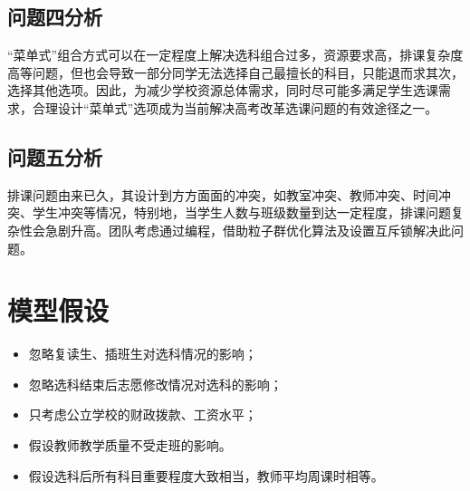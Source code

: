 \documentclass[bwprint]{cumcmthesis}
\begin{document}
\subsection{问题四分析}
“菜单式”组合方式可以在一定程度上解决选科组合过多，资源要求高，排课复杂度高等问题，但也会导致一部分同学无法选择自己最擅长的科目，只能退而求其次，选择其他选项。因此，为减少学校资源总体需求，同时尽可能多满足学生选课需求，合理设计“菜单式”选项成为当前解决高考改革选课问题的有效途径之一。
\subsection{问题五分析}
排课问题由来已久，其设计到方方面面的冲突，如教室冲突、教师冲突、时间冲突、学生冲突等情况，特别地，当学生人数与班级数量到达一定程度，排课问题复杂性会急剧升高。团队考虑通过编程，借助粒子群优化算法及设置互斥锁解决此问题。


\section{模型假设}
\begin{itemize}
\item 忽略复读生、插班生对选科情况的影响；
\item 忽略选科结束后志愿修改情况对选科的影响；
\item 只考虑公立学校的财政拨款、工资水平；
\item 假设教师教学质量不受走班的影响。
\item 假设选科后所有科目重要程度大致相当，教师平均周课时相等。
\end{itemize}
\end{document}
